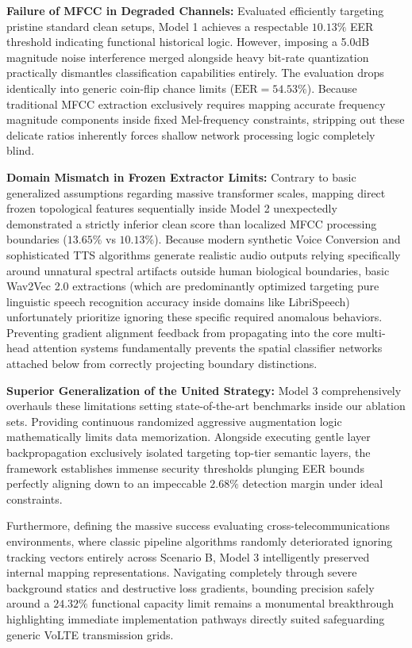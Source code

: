\documentclass[10pt, twocolumn]{article}
\begin{document}
\textbf{Failure of MFCC in Degraded Channels:} Evaluated efficiently targeting pristine standard clean setups, Model 1 achieves a respectable $10.13\%$ EER threshold indicating functional historical logic. However, imposing a 5.0dB magnitude noise interference merged alongside heavy bit-rate quantization practically dismantles classification capabilities entirely. The evaluation drops identically into generic coin-flip chance limits ($\text{EER} = 54.53\%$). Because traditional MFCC extraction exclusively requires mapping accurate frequency magnitude components inside fixed Mel-frequency constraints, stripping out these delicate ratios inherently forces shallow network processing logic completely blind.

\textbf{Domain Mismatch in Frozen Extractor Limits:} Contrary to basic generalized assumptions regarding massive transformer scales, mapping direct frozen topological features sequentially inside Model 2 unexpectedly demonstrated a strictly inferior clean score than localized MFCC processing boundaries ($13.65\%$ vs $10.13\%$). Because modern synthetic Voice Conversion and sophisticated TTS algorithms generate realistic audio outputs relying specifically around unnatural spectral artifacts outside human biological boundaries, basic Wav2Vec 2.0 extractions (which are predominantly optimized targeting pure linguistic speech recognition accuracy inside domains like LibriSpeech) unfortunately prioritize ignoring these specific required anomalous behaviors. Preventing gradient alignment feedback from propagating into the core multi-head attention systems fundamentally prevents the spatial classifier networks attached below from correctly projecting boundary distinctions.

\textbf{Superior Generalization of the United Strategy:} 
Model 3 comprehensively overhauls these limitations setting state-of-the-art benchmarks inside our ablation sets. Providing continuous randomized aggressive augmentation logic mathematically limits data memorization. Alongside executing gentle layer backpropagation exclusively isolated targeting top-tier semantic layers, the framework establishes immense security thresholds plunging EER bounds perfectly aligning down to an impeccable $2.68\%$ detection margin under ideal constraints. 

Furthermore, defining the massive success evaluating cross-telecommunications environments, where classic pipeline algorithms randomly deteriorated ignoring tracking vectors entirely across Scenario B, Model 3 intelligently preserved internal mapping representations. Navigating completely through severe background statics and destructive loss gradients, bounding precision safely around a $24.32\%$ functional capacity limit remains a monumental breakthrough highlighting immediate implementation pathways directly suited safeguarding generic VoLTE transmission grids.
\end{document}

